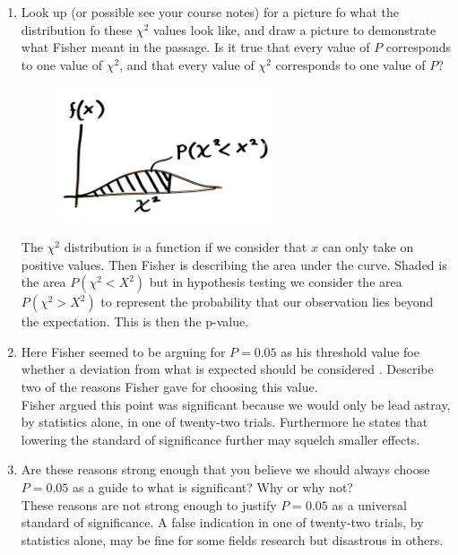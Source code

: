 \documentclass[a4paper, 12pt]{../../config/homework}
\begin{document}
\begin{enumerate}[label=\textbf{Task \arabic*}]
\pagebreak
\item Look up (or possible see your course notes) for a picture fo what the distribution fo these \(\chi^2\) values look like, and draw a picture to demonstrate what Fisher meant in the passage. Is it true that every value of \(P\) corresponds to one value of \(\chi^2\), and that every value of \(\chi^2\) corresponds to one value of \(P\)?
\begin{figure}[h]
    \centering
    \includegraphics[width=0.6\textwidth]{chi_squared.jpeg}
\end{figure}
The \(\chi^2\) distribution is a function if we consider that \(x\) can only take on positive values. Then Fisher is describing the area under the curve. Shaded is the area \(P(\chi^2 < X^2)\) but in hypothesis testing we consider the area \(P(\chi^2 > X^2)\) to represent the probability that our observation lies beyond the expectation. This is then the p-value.

\item Here Fisher seemed to be arguing for \(P=0.05\) as his threshold value foe whether a deviation from what is expected should be considered . Describe two of the reasons Fisher gave for choosing this value.
\\ Fisher argued this point was significant because we would only be lead astray, by statistics alone, in one of twenty-two trials. Furthermore he states that lowering the standard of significance further may squelch smaller effects.

\item Are these reasons strong enough that you believe we should always choose \(P=0.05\) as a guide to what is significant? Why or why not?
\\ These reasons are not strong enough to justify \(P=0.05\) as a universal standard of significance. A false indication in one of twenty-two trials, by statistics alone, may be fine for some fields research but disastrous in others.


\end{enumerate}
\end{document}

